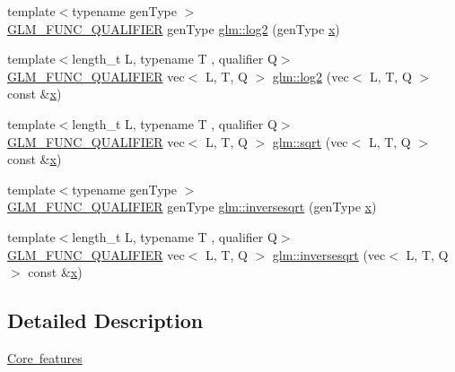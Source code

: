 \begin{DoxyCompactItemize}
\item 
{\footnotesize template$<$typename gen\+Type $>$ }\\\mbox{\hyperlink{setup_8hpp_a33fdea6f91c5f834105f7415e2a64407}{G\+L\+M\+\_\+\+F\+U\+N\+C\+\_\+\+Q\+U\+A\+L\+I\+F\+I\+ER}} gen\+Type \mbox{\hyperlink{namespaceglm_ab47f0f29ead9cefd62d62ba5f83fe81b}{glm\+::log2}} (gen\+Type \mbox{\hyperlink{_s_d_l__opengl_8h_ad0e63d0edcdbd3d79554076bf309fd47}{x}})
\item 
{\footnotesize template$<$length\+\_\+t L, typename T , qualifier Q$>$ }\\\mbox{\hyperlink{setup_8hpp_a33fdea6f91c5f834105f7415e2a64407}{G\+L\+M\+\_\+\+F\+U\+N\+C\+\_\+\+Q\+U\+A\+L\+I\+F\+I\+ER}} vec$<$ L, T, Q $>$ \mbox{\hyperlink{group__core__func__exponential_ga82831c7d9cca777cebedfe03a19c8d75}{glm\+::log2}} (vec$<$ L, T, Q $>$ const \&\mbox{\hyperlink{_s_d_l__opengl_8h_ad0e63d0edcdbd3d79554076bf309fd47}{x}})
\item 
{\footnotesize template$<$length\+\_\+t L, typename T , qualifier Q$>$ }\\\mbox{\hyperlink{setup_8hpp_a33fdea6f91c5f834105f7415e2a64407}{G\+L\+M\+\_\+\+F\+U\+N\+C\+\_\+\+Q\+U\+A\+L\+I\+F\+I\+ER}} vec$<$ L, T, Q $>$ \mbox{\hyperlink{group__core__func__exponential_gaa83e5f1648b7ccdf33b87c07c76cb77c}{glm\+::sqrt}} (vec$<$ L, T, Q $>$ const \&\mbox{\hyperlink{_s_d_l__opengl_8h_ad0e63d0edcdbd3d79554076bf309fd47}{x}})
\item 
{\footnotesize template$<$typename gen\+Type $>$ }\\\mbox{\hyperlink{setup_8hpp_a33fdea6f91c5f834105f7415e2a64407}{G\+L\+M\+\_\+\+F\+U\+N\+C\+\_\+\+Q\+U\+A\+L\+I\+F\+I\+ER}} gen\+Type \mbox{\hyperlink{namespaceglm_a5e3dd2bba414db15477d43ca9d71acf5}{glm\+::inversesqrt}} (gen\+Type \mbox{\hyperlink{_s_d_l__opengl_8h_ad0e63d0edcdbd3d79554076bf309fd47}{x}})
\item 
{\footnotesize template$<$length\+\_\+t L, typename T , qualifier Q$>$ }\\\mbox{\hyperlink{setup_8hpp_a33fdea6f91c5f834105f7415e2a64407}{G\+L\+M\+\_\+\+F\+U\+N\+C\+\_\+\+Q\+U\+A\+L\+I\+F\+I\+ER}} vec$<$ L, T, Q $>$ \mbox{\hyperlink{group__core__func__exponential_ga523dd6bd0ad9f75ae2d24c8e4b017b7a}{glm\+::inversesqrt}} (vec$<$ L, T, Q $>$ const \&\mbox{\hyperlink{_s_d_l__opengl_8h_ad0e63d0edcdbd3d79554076bf309fd47}{x}})
\end{DoxyCompactItemize}


\subsection{Detailed Description}
\mbox{\hyperlink{group__core}{Core features}} 